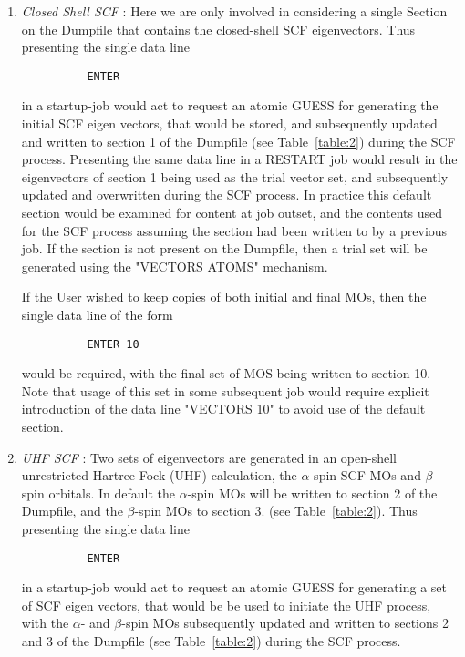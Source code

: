 \documentclass[11pt,fleqn]{article}
\begin{document}
\begin{itemize}
\begin{enumerate}
\item {\em Closed Shell SCF} :  Here we are only involved in considering
a single Section on the Dumpfile that contains the closed-shell SCF
eigenvectors. Thus presenting the single data line

{
\footnotesize
\begin{verbatim}
          ENTER
\end{verbatim}
}
in a startup-job would act to request an atomic GUESS for generating
the initial SCF eigen vectors, that would be stored, and subsequently
updated and written to section 1 of the Dumpfile (see Table~\ref{table:2})
during the SCF process. Presenting the same data line in a RESTART job
would result in the eigenvectors of section 1 being used as the trial
vector set, and subsequently updated and overwritten during the SCF
process. In practice this default section would be examined for content
at job outset, and the contents used for the SCF process assuming the
section had been written to by a previous job. If the section is not
present on the Dumpfile, then a trial set will be generated using the
"VECTORS ATOMS" mechanism.

If the User wished to keep copies of both initial and final MOs, then
the single data line of the form

{
\footnotesize
\begin{verbatim}
          ENTER 10
\end{verbatim}
}
would be required, with the final set of MOS being written to section 10.
Note that usage of this set in some subsequent job would require explicit
introduction of the data line "VECTORS 10" to avoid use of the default
section.

\item {\em UHF SCF} : Two sets of eigenvectors are generated in an open-shell
unrestricted Hartree Fock (UHF) calculation, the $\alpha$-spin SCF MOs
and  $\beta$-spin orbitals.  In default the $\alpha$-spin MOs will be
written to section 2 of the Dumpfile, and the $\beta$-spin MOs to
section 3.  (see Table~\ref{table:2}).  Thus presenting the single data line

{
\footnotesize
\begin{verbatim}
          ENTER
\end{verbatim}
}
in a startup-job would act to request an atomic GUESS for generating
a set of SCF eigen vectors, that would be be used to initiate the UHF
process, with the $\alpha$- and $\beta$-spin MOs subsequently updated
and written to sections 2 and 3 of the Dumpfile (see Table~\ref{table:2})
during the SCF process.


\end{enumerate}
\end{itemize}
\end{document}

